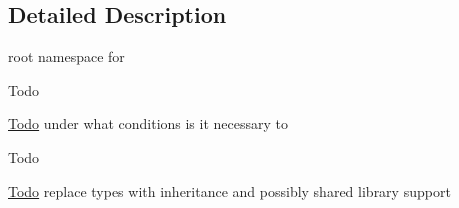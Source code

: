 \subsection{\-Detailed \-Description}
root namespace for  \begin{DoxyRefDesc}{\-Todo}
\item[\hyperlink{todo__todo000005}{\-Todo}]under what conditions is it necessary to \end{DoxyRefDesc}


\begin{DoxyRefDesc}{\-Todo}
\item[\hyperlink{todo__todo000015}{\-Todo}]replace types with inheritance and possibly shared library support \end{DoxyRefDesc}
